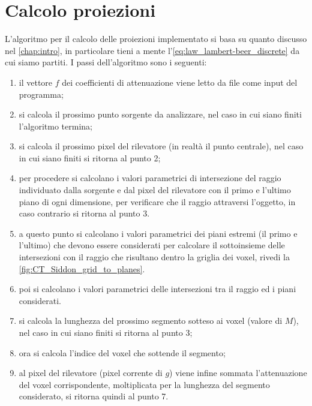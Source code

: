 \documentclass[12pt,a4paper]{report}
\begin{document}
\section{Calcolo proiezioni}

L'algoritmo per il calcolo delle proiezioni implementato si basa su quanto discusso nel \autoref{chap:intro}, in particolare tieni
a mente l'\autoref{eq:law_lambert-beer_discrete} da cui siamo partiti. I passi dell'algoritmo sono i seguenti:
\begin{enumerate}
  \item il vettore \(f\) dei coefficienti di attenuazione viene letto da file come input del programma;
  \item si calcola il prossimo punto sorgente da analizzare, nel caso in cui siano finiti l'algoritmo termina;
  \item si calcola il prossimo pixel del rilevatore (in realtà il punto centrale), nel caso in cui siano finiti si ritorna al
        punto 2;
  \item per procedere si calcolano i valori parametrici di intersezione del raggio individuato dalla sorgente e dal pixel del
        rilevatore con il primo e l'ultimo piano di ogni dimensione, per verificare che il raggio attraversi l'oggetto, in caso
        contrario si ritorna al punto 3.
  \item a questo punto si calcolano i valori parametrici dei piani estremi (il primo e l'ultimo) che devono essere considerati per
        calcolare il sottoinsieme delle intersezioni con il raggio che risultano dentro la griglia dei voxel, rivedi la
        \autoref{fig:CT_Siddon_grid_to_planes}.
  \item poi si calcolano i valori parametrici delle intersezioni tra il raggio ed i piani considerati.
  \item si calcola la lunghezza del prossimo segmento sotteso ai voxel (valore di \(M\)), nel caso in cui siano finiti si ritorna
        al punto 3;
  \item ora si calcola l'indice del voxel che sottende il segmento;
  \item al pixel del rilevatore (pixel corrente di \(g\)) viene infine sommata l'attenuazione del voxel corrispondente,
        moltiplicata per la lunghezza del segmento considerato, si ritorna quindi al punto 7.
\end{enumerate}
\end{document}
